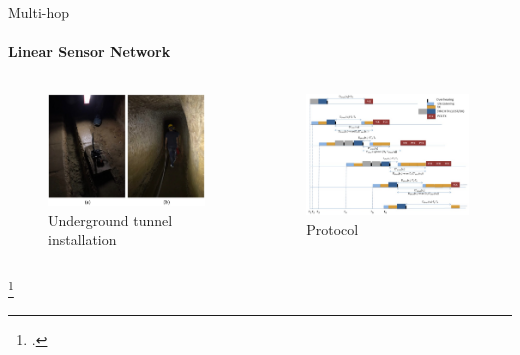 \begin{frame}{Multi-hop}
\framesubtitle{Linear Sensor Network}
\begin{columns}
\begin{column}{0.5\textwidth}
\begin{figure}[H]
    \centering
    \includegraphics[width=1\textwidth]{presentation.tex/fig/lsnlora.jpg}
    \caption{Underground tunnel installation\footnotemark}
\end{figure}
\end{column}
\begin{column}{0.5\textwidth}
\begin{figure}[H]
    \centering
    \includegraphics[width=0.98\textwidth]{presentation.tex/fig/lsnlora2.jpg}
    \caption{Protocol\footnotemark}
\end{figure}
\end{column}
\end{columns}
\footcitetext{Abrardo_2019}
\end{frame}




